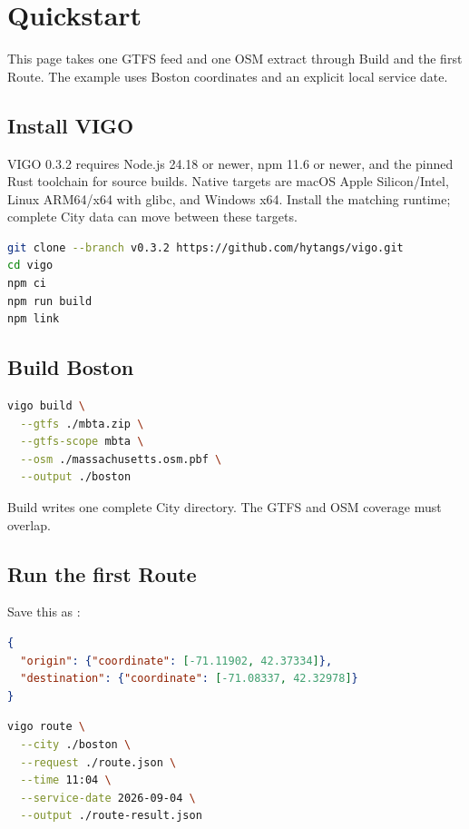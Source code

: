 \documentclass[10pt,letterpaper]{article}
\begin{document}
\guideheader

\section{Quickstart}

This page takes one GTFS feed and one OSM extract through Build and the first Route. The example uses Boston coordinates and an explicit local service date.

\subsection{Install VIGO}

VIGO 0.3.2 requires Node.js 24.18 or newer, npm 11.6 or newer, and the pinned Rust toolchain for source builds. Native targets are macOS Apple Silicon/Intel, Linux ARM64/x64 with glibc, and Windows x64. Install the matching runtime; complete City data can move between these targets.

\begin{lstlisting}[language=bash]
git clone --branch v0.3.2 https://github.com/hytangs/vigo.git
cd vigo
npm ci
npm run build
npm link
\end{lstlisting}

\subsection{Build Boston}

\begin{lstlisting}[language=bash]
vigo build \
  --gtfs ./mbta.zip \
  --gtfs-scope mbta \
  --osm ./massachusetts.osm.pbf \
  --output ./boston
\end{lstlisting}

Build writes one complete City directory. The GTFS and OSM coverage must overlap.

\subsection{Run the first Route}

Save this as \code{route.json}:

\begin{lstlisting}[language=json]
{
  "origin": {"coordinate": [-71.11902, 42.37334]},
  "destination": {"coordinate": [-71.08337, 42.32978]}
}
\end{lstlisting}

\begin{lstlisting}[language=bash]
vigo route \
  --city ./boston \
  --request ./route.json \
  --time 11:04 \
  --service-date 2026-09-04 \
  --output ./route-result.json
\end{lstlisting}
\end{document}
